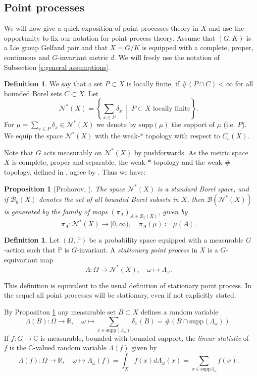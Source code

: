 \documentclass[12pt,reqno,a4paper]{amsart}
\theoremstyle{theorem}
\newtheorem{proposition}[theorem]{Proposition}
\theoremstyle{definition}
\newtheorem{definition}[theorem]{Definition}
\numberwithin{theorem}{section}
\numberwithin{equation}{section}
\newcommand{\R}{\mathbb{R}}
\newcommand{\C}{\mathbb{C}}
\newcommand{\setdiv}{\ \middle|\ }
\newcommand{\supp}{\mathrm{supp}}
\begin{document}
\subsection{Point processes}
We will now give a quick exposition of point processes theory in $X$ and use the opportunity to fix our notation for point process theory.
Assume that $(G,K)$ is a Lie group Gelfand pair and that $X=G/K$ is equipped with a complete, proper, continuous and $G$-invariant metric $d$. We will freely use the notation of Subsection \ref{s:general assumptions}.
\begin{definition}
	We say that a set $P\subset X$ is locally finite, if $\#(P\cap C)<\infty$ for all bounded Borel sets $C\subset X$.
	Let \[\mathcal{N}^*(X) = \left\{\sum_{x\in P}\delta_x\setdiv P\subset X\text{ locally finite}\right\}.\]
	For $\mu=\sum_{x\in P}\delta_x\in \mathcal{N}^*(X)$ we denote by $\supp(\mu)$ the support of $\mu$ (i.e. $P$).
	We equip the space $\mathcal{N}^*(X)$ with the weak-$*$ topology with respect to $C_c(X)$.
\end{definition}
Note that $G$ acts measurably on $\mathcal{N}^*(X)$ by pushforwards.
As the metric space $X$ is complete, proper and separable, the weak-$*$ topology and the weak-$\#$ topology,  defined in  \cite[Definition 9.1.II]{DaleyVere-Jones2}, agree by \cite[A.2.6.1]{DaleyVere-Jones1}. Thus we have:
\begin{proposition}[Prohorov, {\cite[A.2.6.III]{DaleyVere-Jones1}}]\label{prop:N_star_std_Borel}
	The space $\mathcal{N}^*(X)$ is a standard Borel space, and if $\mathcal{B}_b(X)$ denotes the set of all bounded Borel subsets in $X$, then $\mathcal{B}(\mathcal{N}^*(X))$ is generated by the family of maps $(\pi_A)_{A\in \mathcal{B}_b(X)}$, given by
	\[\pi_A: \mathcal{N}^*(X)\to [0,\infty),\quad \pi_A(\mu)\coloneqq \mu(A).\]
\end{proposition}

\begin{definition}
	Let $(\Omega, \mathbb{P})$ be a probability space equipped with a measurable $G$-action such that $\mathbb{P}$ is $G$-invariant.
	A \emph{stationary point process} in $X$ is a $G$-equivariant map
	\[\Lambda: \Omega\to \mathcal{N}^*(X),\quad \omega\mapsto \Lambda_\omega.\]
\end{definition}
This definition is equivalent to the usual definition of stationary point process. In the sequel all point processes will be stationary, even if not explicitly stated.

By Proposiiton \ref{prop:N_star_std_Borel} any measurable set $B\subset X$ defines a random  variable
\[\Lambda(B):\Omega\to \R,\quad \omega\mapsto \sum_{x\in \supp(\Lambda_\omega)}\delta_x(B) = \#(B\cap \supp(\Lambda_\omega)).\]
If $f:G\to \C$ is measurable, bounded with bounded support, the \emph{linear statistic} of $f$ is the $\C$-valued random variable $\Lambda(f)$ given by 
\[\Lambda(f): \Omega\to \R,\quad \omega\mapsto \Lambda_\omega(f) = \int_X f(x)d\Lambda_\omega(x) = \sum_{x\in \supp{\Lambda_\omega}}f(x).\]
\end{document}
